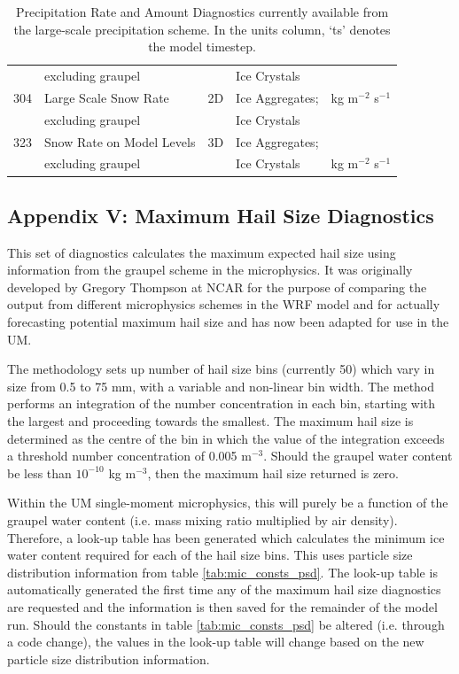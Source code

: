 \documentclass{UMDP_article}
\begin{document}
\begin{table}[h!]
\begin{center}
\begin{tabular}{|l|l|c|l|l|}
     & excluding graupel            &    & Ice Crystals    & \\
304  & Large Scale Snow Rate        & 2D & Ice Aggregates; & kg m$^{-2}$ s$^{-1}$ \\
     & excluding graupel            &    & Ice Crystals    & \\
323  & Snow Rate on Model Levels    & 3D & Ice Aggregates; & \\
     & excluding graupel            &    & Ice Crystals    & kg m$^{-2}$ s$^{-1}$ \\
\hline
\end{tabular}
\caption{\label{tab:precip_diag} Precipitation Rate and Amount Diagnostics currently 
available from the large-scale precipitation scheme. In the units column, `ts' denotes 
the model timestep.}
\end{center}
\end{table}

\clearpage
{}
{}
\subsection*{Appendix V: Maximum Hail Size Diagnostics}

This set of diagnostics calculates the maximum expected hail size using
information from the graupel scheme in the microphysics. It was originally
developed by Gregory Thompson at NCAR for the purpose of comparing the output 
from different microphysics schemes in the WRF model and for actually
forecasting potential maximum hail size and has now been adapted for use in 
the UM. 

The methodology sets up number of hail size bins (currently 50) which vary
in size from 0.5 to 75 mm, with a variable and non-linear bin width. The
method performs an integration of the number concentration in each bin,
starting with the largest and proceeding towards the smallest. The maximum
hail size is determined as the centre of the bin in which the value of the
integration exceeds a threshold number concentration of 0.005 m$^{-3}$.
Should the graupel water content be less than $10^{-10}$ kg m$^{-3}$,
then the maximum hail size returned is zero.

Within the UM single-moment microphysics, this will purely be a function
of the graupel water content (i.e. mass mixing ratio multiplied by air density).
Therefore, a look-up table has been generated which calculates the minimum 
ice water content required for each of the hail size bins. This uses particle 
size distribution information from table \ref{tab:mic_consts_psd}. The look-up 
table is automatically generated the first time any of the maximum hail size 
diagnostics are requested and the information is then saved for the remainder 
of the model run. Should the constants in table \ref{tab:mic_consts_psd} be 
altered (i.e. through a code change), the values in the look-up table will 
change based on the new particle size distribution information. 
\end{document}
